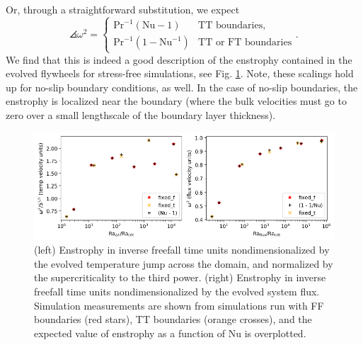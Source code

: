 Or, through a straightforward substitution, we expect
\begin{equation}
\angles{\omega^2} = 
\begin{cases}
\text{Pr}^{-1} (\text{Nu} - 1)  & \text{TT boundaries}, \\
\text{Pr}^{-1} (1 - \text{Nu}^{-1}) & \text{TT or FT boundaries}
\end{cases}.
\end{equation}
We find that this is indeed a good description of the enstrophy contained in the evolved flywheels for stress-free simulations, see Fig. \ref{fig:enstrophy}.
Note, these scalings hold up for no-slip boundary conditions, as well.
In the case of no-slip boundaries, the enstrophy is localized near the boundary (where the bulk velocities must go to zero over a small lengthscale of the boundary layer thickness).

\begin{figure}[t!]
    \includegraphics[width=\textwidth]{figs/unpublished/enstrophy_v_ra.pdf}
    \caption[Evolved enstrophy in RBC simulations.]{
	(left) Enstrophy in inverse freefall time units nondimensionalized by the evolved temperature jump across the domain, and normalized by the supercriticality to the third power.
	(right) Enstrophy in inverse freefall time units nondimensionalized by the evolved system flux.
	Simulation measurements are shown from simulations run with FF boundaries (red stars), TT boundaries (orange crosses), and the expected value of enstrophy as a function of Nu is overplotted.
    \label{fig:enstrophy} }
\end{figure}

